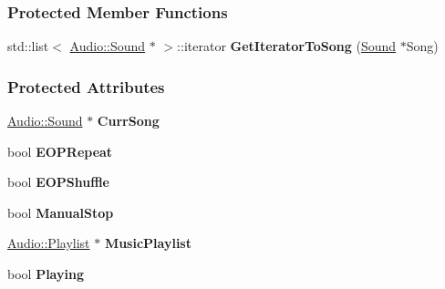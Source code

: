 \subsubsection*{Protected Member Functions}
\begin{DoxyCompactItemize}
\item 
\hypertarget{classMezzanine_1_1Audio_1_1MusicPlayer_a1ea1c375b6a3bac8ef225bd62558dcbb}{
std::list$<$ \hyperlink{classMezzanine_1_1Audio_1_1Sound}{Audio::Sound} $\ast$ $>$::iterator {\bfseries GetIteratorToSong} (\hyperlink{classMezzanine_1_1Audio_1_1Sound}{Sound} $\ast$Song)}
\label{classMezzanine_1_1Audio_1_1MusicPlayer_a1ea1c375b6a3bac8ef225bd62558dcbb}

\end{DoxyCompactItemize}
\subsubsection*{Protected Attributes}
\begin{DoxyCompactItemize}
\item 
\hypertarget{classMezzanine_1_1Audio_1_1MusicPlayer_a686d0e56c8f112ddc2ce497d3345f4fc}{
\hyperlink{classMezzanine_1_1Audio_1_1Sound}{Audio::Sound} $\ast$ {\bfseries CurrSong}}
\label{classMezzanine_1_1Audio_1_1MusicPlayer_a686d0e56c8f112ddc2ce497d3345f4fc}

\item 
\hypertarget{classMezzanine_1_1Audio_1_1MusicPlayer_af7a95635f257d812cd85f3eed041cd3c}{
bool {\bfseries EOPRepeat}}
\label{classMezzanine_1_1Audio_1_1MusicPlayer_af7a95635f257d812cd85f3eed041cd3c}

\item 
\hypertarget{classMezzanine_1_1Audio_1_1MusicPlayer_a26a63239fad128d4f71fd393b58714f6}{
bool {\bfseries EOPShuffle}}
\label{classMezzanine_1_1Audio_1_1MusicPlayer_a26a63239fad128d4f71fd393b58714f6}

\item 
\hypertarget{classMezzanine_1_1Audio_1_1MusicPlayer_a15d7c02534b98da44db4fc5da8390234}{
bool {\bfseries ManualStop}}
\label{classMezzanine_1_1Audio_1_1MusicPlayer_a15d7c02534b98da44db4fc5da8390234}

\item 
\hypertarget{classMezzanine_1_1Audio_1_1MusicPlayer_a305f6af3262c26e93434aa49c54b9906}{
\hyperlink{classMezzanine_1_1Audio_1_1Playlist}{Audio::Playlist} $\ast$ {\bfseries MusicPlaylist}}
\label{classMezzanine_1_1Audio_1_1MusicPlayer_a305f6af3262c26e93434aa49c54b9906}

\item 
\hypertarget{classMezzanine_1_1Audio_1_1MusicPlayer_a43051ebab68f7a38112cd80925442ff1}{
bool {\bfseries Playing}}
\label{classMezzanine_1_1Audio_1_1MusicPlayer_a43051ebab68f7a38112cd80925442ff1}

\end{DoxyCompactItemize}


